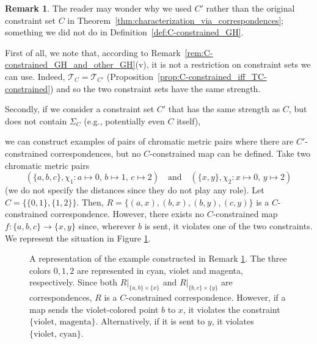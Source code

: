 \documentclass[8pt,a4paper,oneside,english,english]{article}
\theoremstyle{plain}
\theoremstyle
{plain}
\theoremstyle{definition}
\newtheorem{remark}[theorem]{Remark}%
\newcommand{\Tau}{\mathcal T}
\begin{document}
\begin{remark}\label{rem:why_intersection?}
	The reader may wonder why we used $C'$ rather than the original constraint set $C$ in Theorem~\ref{thm:characterization_via_correspondences}; something we did not do in Definition~\ref{def:C-constrained_GH}.
	
	First of all, we note that, according to Remark~\ref{rem:C-constrained_GH_and_other_GH}(v), it is not a restriction on constraint sets we can use. Indeed, $\Tau_C=\Tau_{C'}$ (Proposition~\ref{prop:C-constrained_iff_TC-constrained}) and so the two constraint sets have the same strength.
	
	Secondly, if we consider a constraint set $C'$ that has the same strength as $C$, but does not contain $\Sigma_C$ (e.g., potentially even $C$ itself), 
    
    we can construct examples of pairs of chromatic metric pairs where there are $C'$-constrained correspondences, but no $C$-constrained map can be defined. Take two chromatic metric pairs 
	\[
	(\{a,b,c\},\chi_1\colon a\mapsto 0,\,b\mapsto 1,\, c\mapsto 2)\quad\text{and}\quad (\{x,y\},\chi_2\colon x\mapsto 0,\, y\mapsto 2)
	\]
    (we do not specify the distances since they do not play any role). Let $C=\{\{0,1\},\{1,2\}\}$. Then, $R=\{(a,x),(b,x),(b,y),(c,y)\}$ is a $C$-constrained correspondence. However, there exists no $C$-constrained map $f\colon\{a,b,c\}\to\{x,y\}$ since, wherever $b$ is sent, it violates one of the two constraints. We represent the situation in Figure \ref{fig:C_closed_under_intersection}.
	\begin{figure}[h!]
		\centering
	\caption{\footnotesize A representation of the example constructed in Remark \ref{rem:why_intersection?}. The three colors $0,1,2$ are represented in cyan, violet and magenta, respectively. Since both $R|_{\{a,b\}\times\{x\}}$ and $R|_{\{b,c\}\times\{y\}}$ are correspondences, $R$ is a $C$-constrained correspondence. However, if a map sends the violet-colored point $b$ to $x$, it violates the constraint $\{\text{violet, magenta}\}$. Alternatively, if it is sent to $y$, it violates $\{\text{violet, cyan}\}$. }\label{fig:C_closed_under_intersection}
	\end{figure}
\end{remark}
\end{document}
